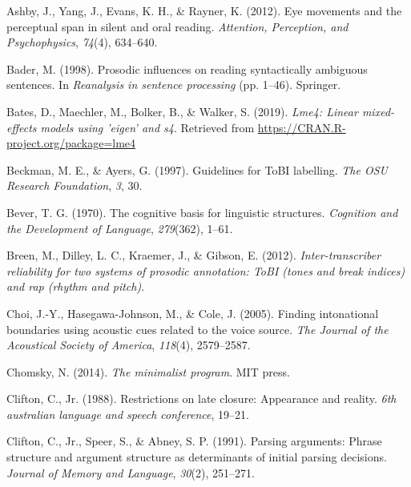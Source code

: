 \documentclass[11pt,oneside]{book}
\begin{document}
\noindent
\vspace{-2em}
\setlength{\parindent}{-0.5in}
\setlength{\leftskip}{0.5in}
\setlength{\parskip}{15pt}

\hypertarget{refs}{}
\leavevmode\hypertarget{ref-ashby2012eye}{}%
Ashby, J., Yang, J., Evans, K. H., \& Rayner, K. (2012). Eye movements and the perceptual span in silent and oral reading. \emph{Attention, Perception, and Psychophysics}, \emph{74}(4), 634--640.

\leavevmode\hypertarget{ref-Bader1998-ts}{}%
Bader, M. (1998). Prosodic influences on reading syntactically ambiguous sentences. In \emph{Reanalysis in sentence processing} (pp. 1--46). Springer.

\leavevmode\hypertarget{ref-R-lme4}{}%
Bates, D., Maechler, M., Bolker, B., \& Walker, S. (2019). \emph{Lme4: Linear mixed-effects models using 'eigen' and s4}. Retrieved from \url{https://CRAN.R-project.org/package=lme4}

\leavevmode\hypertarget{ref-Beckman1997-eu}{}%
Beckman, M. E., \& Ayers, G. (1997). Guidelines for ToBI labelling. \emph{The OSU Research Foundation}, \emph{3}, 30.

\leavevmode\hypertarget{ref-bever1970}{}%
Bever, T. G. (1970). The cognitive basis for linguistic structures. \emph{Cognition and the Development of Language}, \emph{279}(362), 1--61.

\leavevmode\hypertarget{ref-agreements}{}%
Breen, M., Dilley, L. C., Kraemer, J., \& Gibson, E. (2012). \emph{Inter-transcriber reliability for two systems of prosodic annotation: ToBI (tones and break indices) and rap (rhythm and pitch)}.

\leavevmode\hypertarget{ref-choi2005finding}{}%
Choi, J.-Y., Hasegawa-Johnson, M., \& Cole, J. (2005). Finding intonational boundaries using acoustic cues related to the voice source. \emph{The Journal of the Acoustical Society of America}, \emph{118}(4), 2579--2587.

\leavevmode\hypertarget{ref-chomsky2014minimalist}{}%
Chomsky, N. (2014). \emph{The minimalist program}. MIT press.

\leavevmode\hypertarget{ref-clifton1988restrictions}{}%
Clifton, C., Jr. (1988). Restrictions on late closure: Appearance and reality. \emph{6th australian language and speech conference}, 19--21.

\leavevmode\hypertarget{ref-cliftonEtAl1991}{}%
Clifton, C., Jr., Speer, S., \& Abney, S. P. (1991). Parsing arguments: Phrase structure and argument structure as determinants of initial parsing decisions. \emph{Journal of Memory and Language}, \emph{30}(2), 251--271.
\end{document}
